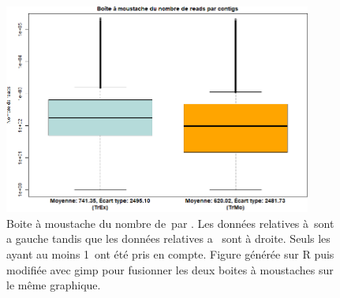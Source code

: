 \documentclass[../main]{subfiles} %
\begin{document}
\addto\extrasfrench{\protected\edef:{\unexpanded\expandafter{:}}}

\begin{figure}[ht]
    \centering
    \includegraphics[width=0.9\textwidth]{../Illustrations/boxplotTr.png}
    \caption{Boite à moustache du nombre de \reads\,par \contigs. Les données relatives à \BamTrEx\,sont a gauche tandis que les données relatives a \BamTrMo\, sont à droite. Seuls les \contigs\,ayant au moins 1 \reads\,ont été pris en compte. Figure générée sur \gls{R} puis modifiée avec \gls{gimp} pour fusionner les deux boites à moustaches sur le même graphique.}
    \label{fig:BoxPlotContigs}
\end{figure}


\end{document}
